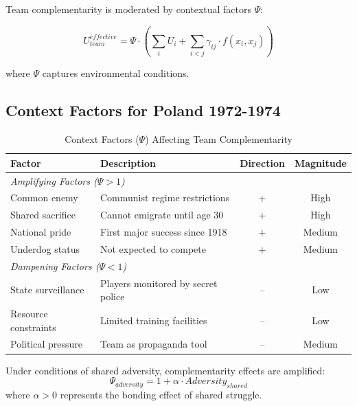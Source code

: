 Team complementarity is moderated by contextual factors $\Psi$:

\begin{equation}
U_{team}^{effective} = \Psi \cdot \left( \sum_{i} U_i + \sum_{i<j} \gamma_{ij} \cdot f(x_i, x_j) \right)
\end{equation}

where $\Psi$ captures environmental conditions.

\subsection{Context Factors for Poland 1972-1974}

\begin{table}[h]
\centering
\caption{Context Factors ($\Psi$) Affecting Team Complementarity}
\label{tab:context}
\begin{tabular}{llcc}
\toprule
\textbf{Factor} & \textbf{Description} & \textbf{Direction} & \textbf{Magnitude} \\
\midrule
\multicolumn{4}{l}{\textit{Amplifying Factors ($\Psi > 1$)}} \\
Common enemy & Communist regime restrictions & + & High \\
Shared sacrifice & Cannot emigrate until age 30 & + & High \\
National pride & First major success since 1918 & + & Medium \\
Underdog status & Not expected to compete & + & Medium \\
\midrule
\multicolumn{4}{l}{\textit{Dampening Factors ($\Psi < 1$)}} \\
State surveillance & Players monitored by secret police & – & Low \\
Resource constraints & Limited training facilities & – & Low \\
Political pressure & Team as propaganda tool & – & Medium \\
\bottomrule
\end{tabular}
\end{table}

\begin{proposition}
Under conditions of shared adversity, complementarity effects are amplified:
\begin{equation}
\Psi_{adversity} = 1 + \alpha \cdot Adversity_{shared}
\end{equation}
where $\alpha > 0$ represents the bonding effect of shared struggle.
\end{proposition}

